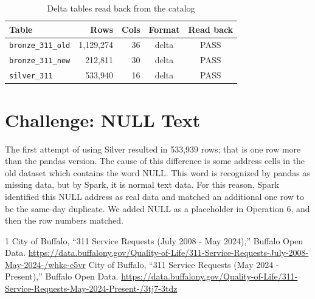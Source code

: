 \documentclass[conference]{IEEEtran}
\begin{document}
\begin{table}[h]
\centering
\caption{Delta tables read back from the catalog}
\label{tab:delta}
\begin{tabular}{lrrcc}
\toprule
Table & Rows & Cols & Format & Read back \\
\midrule
\texttt{bronze\_311\_old} & 1,129,274 & 36 & delta & PASS \\
\texttt{bronze\_311\_new} & 212,811 & 30 & delta & PASS \\
\texttt{silver\_311} & 533,940 & 16 & delta & PASS \\
\bottomrule
\end{tabular}
\end{table}

\section{Challenge: NULL Text}
The first attempt of using Silver resulted in 533,939 rows; that is one row more than the pandas version. The cause of this difference is some address cells in the old dataset which contains the word NULL. This word is recognized by pandas as missing data, but by Spark, it is normal text data. For this reason, Spark identified this NULL address as real data and matched an additional one row to be the same-day duplicate. We added NULL as a placeholder in Operation 6, and then the row numbers matched.

\begin{thebibliography}{1}
 City of Buffalo, ``311 Service Requests (July 2008 - May 2024),'' Buffalo Open Data. \url{https://data.buffalony.gov/Quality-of-Life/311-Service-Requests-July-2008-May-2024-/whkc-e5vr}
 City of Buffalo, ``311 Service Requests (May 2024 - Present),'' Buffalo Open Data. \url{https://data.buffalony.gov/Quality-of-Life/311-Service-Requests-May-2024-Present-/3tj7-3tdz}
\end{thebibliography}
\end{document}
